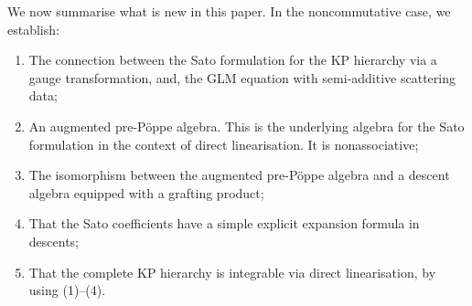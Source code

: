 \documentclass[5p,twocolumn]{elsarticle}
\begin{document}
We now summarise what is new in this paper. In the noncommutative case, we establish:
%
\begin{enumerate}
\item[(1)] The connection between the Sato formulation for the KP hierarchy via a gauge transformation, and, the GLM equation with semi-additive scattering data; 
\item[(2)] An augmented pre-P\"oppe algebra. This is the underlying algebra for the Sato formulation in the context of direct linearisation. It is nonassociative;
\item[(3)] The isomorphism between the augmented pre-P\"oppe algebra and a descent algebra equipped with a grafting product;
\item[(4)] That the Sato coefficients have a simple explicit expansion formula in descents; 
\item[(5)] That the complete KP hierarchy is integrable via direct linearisation, by using (1)--(4).
\end{enumerate}
%
\end{document}
